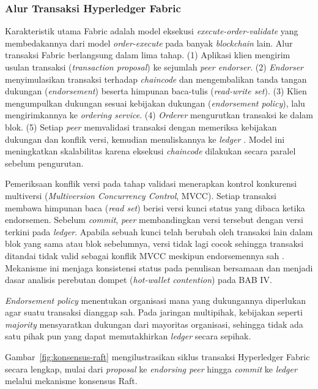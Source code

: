 

\subsubsection{Alur Transaksi Hyperledger Fabric}

Karakteristik utama Fabric adalah model eksekusi
\textit{execute-order-validate} yang membedakannya dari model
\textit{order-execute} pada banyak \textit{blockchain} lain. Alur transaksi
Fabric berlangsung dalam lima tahap. (1) Aplikasi klien mengirim usulan
transaksi (\textit{transaction proposal}) ke sejumlah \textit{peer endorser}.
(2) \textit{Endorser} menyimulasikan transaksi terhadap \textit{chaincode} dan
mengembalikan tanda tangan dukungan (\textit{endorsement}) beserta himpunan
baca-tulis (\textit{read-write set}). (3) Klien mengumpulkan dukungan sesuai
kebijakan dukungan (\textit{endorsement policy}), lalu mengirimkannya ke
\textit{ordering service}. (4) \textit{Orderer} mengurutkan transaksi ke dalam
blok. (5) Setiap \textit{peer} memvalidasi transaksi dengan memeriksa kebijakan
dukungan dan konflik versi, kemudian menuliskannya ke \textit{ledger}
\cite{androulaki2018}. Model ini meningkatkan skalabilitas karena eksekusi
\textit{chaincode} dilakukan secara paralel sebelum pengurutan.

Pemeriksaan konflik versi pada tahap validasi menerapkan kontrol konkurensi
multiversi (\textit{Multiversion Concurrency Control}, MVCC). Setiap transaksi
membawa himpunan baca (\textit{read set}) berisi versi kunci status yang dibaca
ketika endorsemen. Sebelum \textit{commit}, \textit{peer} membandingkan versi
tersebut dengan versi terkini pada \textit{ledger}. Apabila sebuah kunci telah
berubah oleh transaksi lain dalam blok yang sama atau blok sebelumnya, versi
tidak lagi cocok sehingga transaksi ditandai tidak valid sebagai konflik MVCC
meskipun endorsemennya sah \cite{androulaki2018}. Mekanisme ini menjaga
konsistensi status pada penulisan bersamaan dan menjadi dasar analisis
perebutan dompet (\textit{hot-wallet contention}) pada BAB IV.

\textit{Endorsement policy} menentukan organisasi mana yang dukungannya
diperlukan agar suatu transaksi dianggap sah. Pada jaringan multipihak,
kebijakan seperti \textit{majority} mensyaratkan dukungan dari mayoritas
organisasi, sehingga tidak ada satu pihak pun yang dapat memutakhirkan
\textit{ledger} secara sepihak.

Gambar~\ref{fig:konsensus-raft} mengilustrasikan siklus transaksi Hyperledger
Fabric secara lengkap, mulai dari \textit{proposal} ke \textit{endorsing peer}
hingga \textit{commit} ke \textit{ledger} melalui mekanisme konsensus Raft.

